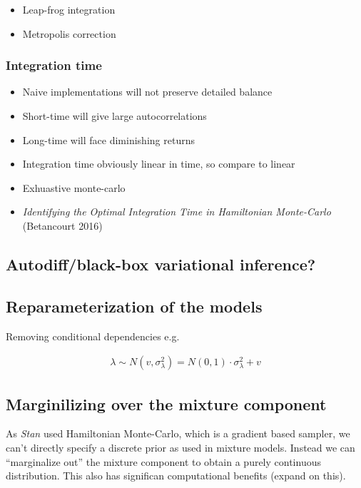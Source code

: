 \documentclass{article}
\begin{document}
\begin{itemize}
\item Leap-frog integration
\item Metropolis correction
\end{itemize}

\subsubsection{Integration time}

\begin{itemize}
\item Naive implementations will not preserve detailed balance
\item Short-time will give large autocorrelations
\item Long-time will face diminishing returns
\item Integration time obviously linear in time, so compare to linear
\item Exhuastive monte-carlo
\item \emph{Identifying the Optimal Integration Time in Hamiltonian Monte-Carlo} (Betancourt 2016)
\end{itemize}

\subsection{Autodiff/black-box variational inference?}

\subsection{Reparameterization of the models}

Removing conditional dependencies e.g.

\begin{align*}
\lambda \sim N(v, \sigma^2_\lambda) = N(0, 1) \cdot \sigma_\lambda^2 + v
\end{align*}

\subsection{Marginilizing over the mixture component}

As \emph{Stan} used Hamiltonian Monte-Carlo, which is a gradient based sampler, we can't directly specify a discrete prior as used in mixture models. Instead we can ``marginalize out'' the mixture component to obtain a purely continuous distribution. This also has significan computational benefits (expand on this). \\
\end{document}

